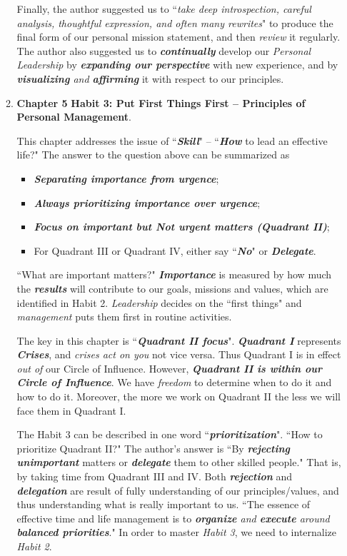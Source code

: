 \documentclass[11pt]{article}
\begin{document}
\begin{enumerate}
\begin{enumerate}
Finally, the author suggested us to ``\emph{take deep introspection, careful analysis, thoughtful expression, and often many rewrites}" to produce the final form of our personal mission statement, and then \emph{review} it regularly. The author also suggested us to \emph{\textbf{continually}} develop our \emph{Personal Leadership} by \emph{\textbf{expanding our perspective}} with new experience, and by \emph{\textbf{visualizing} and \textbf{affirming}} it with respect to our principles.


\item \textbf{Chapter 5} \textbf{Habit 3: Put First Things First -- Principles of Personal Management}. 

This chapter addresses the issue of ``\emph{\textbf{Skill}}" -- ``\emph{\textbf{How}} to lead an effective life?"  The answer to the question above can be summarized as
\begin{itemize}
\item \emph{\textbf{Separating importance from urgence}};
\item \emph{\textbf{Always prioritizing importance over urgence}};
\item \emph{\textbf{Focus on important but Not urgent matters (Quadrant II)}};
\item For Quadrant III or Quadrant IV, either say ``\emph{\textbf{No}}" or \emph{\textbf{Delegate}}.
\end{itemize} ``What are important matters?" \emph{\textbf{Importance}} is measured by how much the \emph{\textbf{results}} will contribute to our goals, missions and values, which are identified in Habit 2. \emph{Leadership} decides on the ``first things" and \emph{management} puts them first in routine activities.

The key in this chapter is ``\emph{\textbf{Quadrant II focus}}". \emph{\textbf{Quadrant I}} represents \emph{\textbf{Crises}}, and \emph{crises act on you} not vice versa. Thus Quadrant I is in effect \emph{out of} our Circle of Influence. However, \emph{\textbf{Quadrant II is within our Circle of Influence}}. We have \emph{freedom} to determine when to do it and how to do it. Moreover, the more we work on Quadrant II the less we will face them in Quadrant I. 

The Habit 3 can be described in one word ``\emph{\textbf{prioritization}}".  ``How to prioritize Quadrant II?" The author's answer is ``By \emph{\textbf{rejecting}} \emph{\textbf{unimportant}} matters or \emph{\textbf{delegate}} them to other skilled people." That is, by taking time from Quadrant III and IV.  Both \emph{\textbf{rejection}} and \emph{\textbf{delegation}} are result of fully understanding of our principles/values, and thus understanding what is really important to us. ``The essence of effective time and life management is to \emph{\textbf{organize} and \textbf{execute} around \textbf{balanced priorities}}." In order to master \emph{Habit 3}, we need to internalize \emph{Habit 2}.


\end{enumerate}
\end{enumerate}
\end{document}
